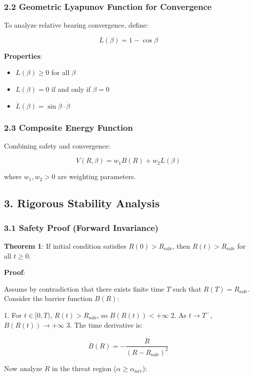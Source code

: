 \documentclass[11pt,a4paper]{article}
\numberwithin{equation}{section}
\begin{document}
\subsubsection{2.2 Geometric Lyapunov Function for Convergence}

To analyze relative bearing convergence, define:

\[
L(\beta) = 1 - \cos\beta
\]

\textbf{Properties}:
\begin{itemize}
\item $L(\beta) \geq 0$ for all $\beta$
\item $L(\beta) = 0$ if and only if $\beta = 0$
\item $\dot{L}(\beta) = \sin\beta \cdot \dot{\beta}$
\end{itemize}

\subsubsection{2.3 Composite Energy Function}

Combining safety and convergence:

\[
V(R, \beta) = w_1 B(R) + w_2 L(\beta)
\]

where $w_1, w_2 > 0$ are weighting parameters.

\subsection{3. Rigorous Stability Analysis}

\subsubsection{3.1 Safety Proof (Forward Invariance)}

\textbf{Theorem 1}: If initial condition satisfies $R(0) > R_{\text{safe}}$, then $R(t) > R_{\text{safe}}$ for all $t \geq 0$.

\textbf{Proof}:

Assume by contradiction that there exists finite time $T$ such that $R(T) = R_{\text{safe}}$. Consider the barrier function $B(R)$:

1. For $t \in [0, T)$, $R(t) > R_{\text{safe}}$, so $B(R(t)) < +\infty$
2. As $t \to T^-$, $B(R(t)) \to +\infty$
3. The time derivative is:

\[
\dot{B}(R) = -\frac{\dot{R}}{(R - R_{\text{safe}})^2}
\]

Now analyze $\dot{R}$ in the threat region ($\alpha \geq \alpha_{\text{nav}}$):
\end{document}
